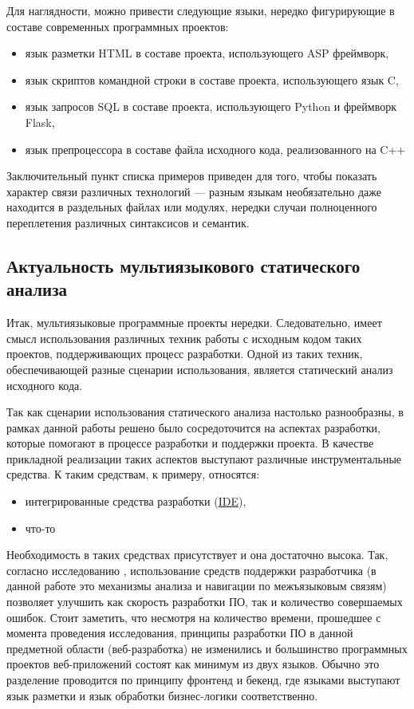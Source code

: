 Для наглядности, можно привести следующие языки, нередко фигурирующие в составе современных программных проектов:
\begin{itemize}    
    \item язык разметки HTML в составе проекта, использующего ASP фреймворк,
    \item язык скриптов командной строки в составе проекта, использующего язык C,
    \item язык запросов SQL в составе проекта, использующего Python и фреймворк Flask,
    \item язык препроцессора в составе файла исходного кода, реализованного на C++
\end{itemize}
Заключительный пункт списка примеров приведен для того, чтобы показать характер
связи различных технологий — разным языкам необязательно даже находится в раздельных
файлах или модулях, нередки случаи полноценного переплетения различных синтаксисов и
семантик.

\subsection{Актуальность мультиязыкового статического анализа}

Итак, мультиязыковые программные проекты нередки. Следовательно, имеет смысл использования
различных техник работы с исходным кодом таких проектов, поддерживающих процесс разработки.
Одной из таких техник, обеспечивающей разные сценарии использования, является статический анализ
исходного кода. 


Так как сценарии использования статического анализа настолько разнообразны, в рамках данной работы
решено было сосредоточится на аспектах разработки, которые помогают в процессе разработки и поддержки проекта.
В качестве прикладной реализации таких аспектов выступают различные инструментальные средства.
К таким средствам, к примеру, относятся:
\begin{itemize}
    \item интегрированные средства разработки (\hyperlink{IDE}{IDE}),
    \item что-то %
\end{itemize}

Необходимость в таких средствах присутствует и она достаточно высока. Так, согласно
исследованию \cite{aid-developers}, использование средств поддержки разработчика
(в данной работе это механизмы анализа и навигации по межъязыковым связям) позволяет
улучшить как скорость разработки ПО, так и количество совершаемых ошибок. Стоит заметить,
что несмотря на количество времени, прошедшее с момента проведения исследования, 
принципы разработки ПО в данной предметной области (веб-разработка) не изменились и большинство
программных проектов веб-приложений состоят как минимум из двух языков. 
Обычно это разделение проводится по принципу фронтенд и бекенд, где языками выступают
язык разметки и язык обработки бизнес-логики соответственно.


\clearpage